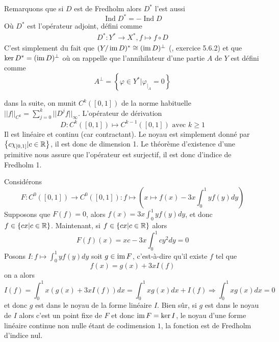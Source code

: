 \documentclass[memoire.tex]{subfiles}
\begin{document}
Remarquons que si $D$ est de Fredholm alors  $D^*$ l'est aussi 
\begin{equation}\label{adjointfred}
    \operatorname*{Ind} D^*=- \operatorname*{Ind} D
\end{equation}
Où $D^{*}$ est l'opérateur adjoint, défini comme
\begin{eqnarray*}
    D^{*}: Y^{*}\rightarrow X^{*}, f\mapsto  f\circ D
\end{eqnarray*}
C'est simplement du fait que $(Y/\operatorname{im} D)^* 
\cong (\operatorname{im} D)^{\perp}$ (\cite{EsserFONCT}, exercice 5.6.2) et que $\ker D^
{*}=(\operatorname{im} D)^{\perp}$
où on rappelle que l'annihilateur d'une partie $A$ de $Y$ est défini comme 
\begin{equation*}
    A^{\perp}=\left\{ \varphi\in Y^{*} |\varphi_{|_A}=0\right\}
\end{equation*}
\begin{exemple}
dans la suite, on munit $C^k([0,1])$ de la norme habituelle $||f||_{C^k}=\sum_{j=0}^k ||D^j f||_{\infty} $. L'opérateur de dérivation 
\begin{equation*}
    D: C^k([0,1])\mapsto C^{k-1}([0,1])\text{ avec $k\geq 1$}
\end{equation*}
Il est linéaire et continu (car contractant).
Le noyau est simplement donné par $\left\{ c\chi_{[0,1]} | c\in \mathbb{R}\right\}$, il est donc de dimension 1. Le théorème d'existence d'une primitive nous assure que l'opérateur est surjectif, il est donc d'indice de Fredholm 1.
\end{exemple}
\begin{exemple}
    Considérons 
    \begin{equation*}
        F: C^0([0,1])\rightarrow C^0([0,1]): f\mapsto (x\mapsto f(x)-3x\int_{0}^{1}yf(y)dy)
    \end{equation*}
    Supposons que $F(f)=0$, alors 
    $f(x)=3x\int_{0}^{1}yf(y)dy$, et donc $f\in\left\{ cx| c\in \mathbb{R}\right\}$. Maintenant, si $f\in\left\{ cx| c\in \mathbb{R}\right\}$ alors 
    \begin{equation*}
        F(f)(x)=xc - 3x\int_{0}^1 cy^2dy=0
    \end{equation*}
    Posons $I:f\mapsto \int_{0}^1 yf(y)dy$ soit $g\in \operatorname{im} F$, c'est-à-dire qu'il existe $f$ tel que 
    \begin{equation*}
        f(x)=g(x)+3xI(f)
    \end{equation*}
    on a alors 
    \begin{equation*}
        I(f) = \int_{0}^1
        x(g(x)+3xI(f))dx = \int_{0}^{1}x g(x)dx + I(f)\Rightarrow \int_{0}^{1} x g(x) dx=0
    \end{equation*}
    et donc $g$ est dans le noyau de la forme linéaire $I$. Bien sûr, si $g$ est dans le noyau de $I$ alors c'est un point fixe de $F$ et donc $\operatorname{im} F= \ker I$, le noyau d'une forme linéaire continue non nulle étant de codimension $1$, la fonction est de Fredholm d'indice nul.
\end{exemple}
\end{document}
